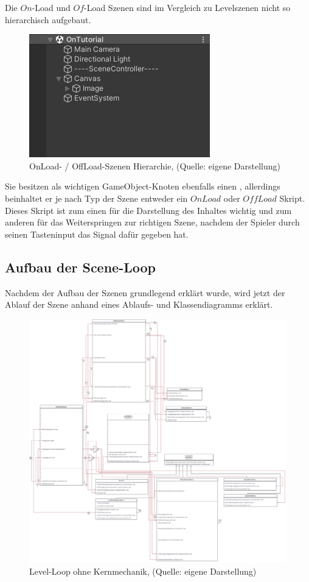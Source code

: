 Die $On$-Load und $Of$-Load Szenen sind im Vergleich zu Levelszenen nicht so hierarchisch aufgebaut.

\begin{figure}[ht]
\centering
\includegraphics[width=0.6\linewidth]{content/pictures/Detail_on_off.jpg}
\caption{OnLoad- / OffLoad-Szenen Hierarchie, (Quelle: eigene Darstellung)}
\label{fig:on_of_load_hierachy}
\end{figure}

Sie besitzen als wichtigen GameObject-Knoten ebenfalls einen , allerdings beinhaltet er je nach Typ der Szene entweder ein $OnLoad$ oder $OffLoad$ Skript. Dieses Skript ist zum einen für die Darstellung des Inhaltes wichtig und zum anderen für das Weiterspringen zur richtigen Szene, nachdem der Spieler durch seinen Tasteninput das Signal dafür gegeben hat.

\subsection{Aufbau der Scene-Loop}\label{sec:scene-loop}
Nachdem der Aufbau der Szenen grundlegend erklärt wurde, wird jetzt der Ablauf der Szene anhand eines Ablaufs- und Klassendiagramms erklärt.

\begin{figure}[ht]
\centering
\includegraphics[width=1\linewidth]{content/pictures/Level_loop_upto_character_creation.jpg}
\caption{Level-Loop ohne Kernmechanik, (Quelle: eigene Darstellung)}
\label{fig:level_game_loop_class_connectors}
\end{figure}

